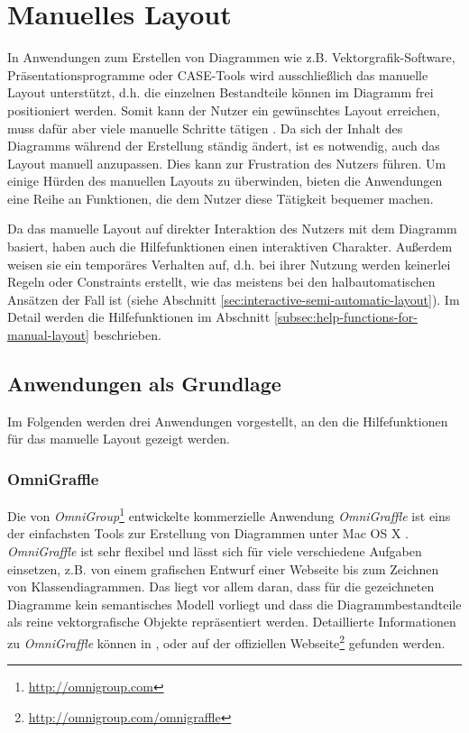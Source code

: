 \section{Manuelles Layout}
\label{sec:manual-layout}

In Anwendungen zum Erstellen von Diagrammen wie z.B. Vektorgrafik-Software, Präsentationsprogramme oder CASE-Tools wird ausschließlich das manuelle Layout unterstützt, d.h. die einzelnen Bestandteile können im Diagramm frei positioniert werden. Somit kann der Nutzer ein gewünschtes Layout erreichen, muss dafür aber viele manuelle Schritte tätigen \cite{Eichelberger05Aesthetics}. Da sich der Inhalt des Diagramms während der Erstellung ständig ändert, ist es notwendig, auch das Layout manuell anzupassen. Dies kann zur Frustration des Nutzers führen. Um einige Hürden des manuellen Layouts zu überwinden, bieten die Anwendungen eine Reihe an Funktionen, die dem Nutzer diese Tätigkeit bequemer machen.

Da das manuelle Layout auf direkter Interaktion des Nutzers mit dem Diagramm basiert, haben auch die Hilfefunktionen einen interaktiven Charakter. Außerdem weisen sie ein temporäres Verhalten auf, d.h. bei ihrer Nutzung werden keinerlei Regeln oder Constraints erstellt, wie das meistens bei den halbautomatischen Ansätzen der Fall ist (siehe Abschnitt \ref{sec:interactive-semi-automatic-layout}). Im Detail werden die Hilfefunktionen im Abschnitt \ref{subsec:help-functions-for-manual-layout} beschrieben.

\subsection{Anwendungen als Grundlage}
\label{subsec:applications-for-manual-layout}

Im Folgenden werden drei Anwendungen vorgestellt, an den die Hilfefunktionen für das manuelle Layout gezeigt werden.

\subsubsection{OmniGraffle}
\label{subsubsec:omnigraffle}

Die von \textit{OmniGroup}\footnote{\url{http://omnigroup.com}} entwickelte kommerzielle Anwendung \textit{OmniGraffle} ist eins der einfachsten Tools zur Erstellung von Diagrammen unter Mac OS X \cite{Olsen10OmniGraffle}. \textit{OmniGraffle} ist sehr flexibel und lässt sich für viele verschiedene Aufgaben einsetzen, z.B. von einem grafischen Entwurf einer Webseite bis zum Zeichnen von Klassendiagrammen. Das liegt vor allem daran, dass für die gezeichneten Diagramme kein semantisches Modell vorliegt und dass die Diagrammbestandteile als reine vektorgrafische Objekte repräsentiert werden. Detaillierte Informationen zu \textit{OmniGraffle} können in \cite{08OmniGraffle}, \cite{Olsen10OmniGraffle} oder auf der offiziellen Webseite\footnote{\url{http://omnigroup.com/omnigraffle}} gefunden werden.

